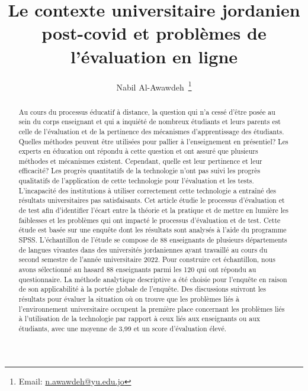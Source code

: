 \documentclass[french]{textolivre}
\title{Le contexte universitaire jordanien post-covid et problèmes de l’évaluation en ligne}
\author[1]{Nabil Al-Awawdeh~\orcid{0000-0003-3788-5669}\thanks{Email: \href{mailto:n.awawdeh@yu.edu.jo}{n.awawdeh@yu.edu.jo}}}
\affil[1]{Yarmouk University, Faculty of Arts, Dept. of modern Languages, Irbid, Jordan.}
\begin{document}
\maketitle

\begin{polyabstract}
\begin{abstract}
Au cours du processus éducatif à distance, la question qui n’a cessé d’être posée au sein du corps enseignant et qui a inquiété de nombreux étudiants et leurs parents est celle de l'évaluation et de la pertinence des mécanismes d'apprentissage des étudiants. Quelles méthodes peuvent être utilisées pour pallier à l’enseignement en présentiel? Les experts en éducation ont répondu à cette question et ont assuré que plusieurs méthodes et mécanismes existent. Cependant, quelle est leur pertinence et leur efficacité? Les progrès quantitatifs de la technologie n'ont pas suivi les progrès qualitatifs de l'application de cette technologie pour l'évaluation et les tests. L'incapacité des institutions à utiliser correctement cette technologie a entraîné des résultats universitaires pas satisfaisants. Cet article étudie le processus d'évaluation et de test afin d'identifier l'écart entre la théorie et la pratique et de mettre en lumière les faiblesses et les problèmes qui ont impacté le processus d'évaluation et de test. Cette étude est basée sur une enquête dont les résultats sont analysés à l'aide du programme SPSS. L'échantillon de l'étude se compose de 88 enseignants de plusieurs départements de langues vivantes dans des universités jordaniennes ayant travaillé au cours du second semestre de l'année universitaire 2022. Pour construire cet échantillon, nous avons sélectionné au hasard 88 enseignants parmi les 120 qui ont répondu au questionnaire. La méthode analytique descriptive a été choisie pour l'enquête en raison de son applicabilité à la portée globale de l'enquête. Des discussions suivront les résultats pour évaluer la situation où on trouve que les problèmes liés à l'environnement universitaire occupent la première place concernant les problèmes liés à l'utilisation de la technologie par rapport à ceux liés aux enseignants ou aux étudiants, avec une moyenne de 3,99 et un score d'évaluation élevé. 


\end{abstract}


\end{polyabstract}
\end{document}
